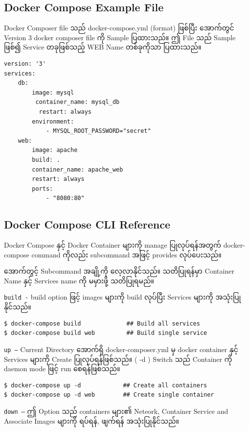 \documentclass{article}
\begin{document}
\subsection{Docker Compose Example
File}\label{docker-compose-example-file}

Docker Composer file သည် docker-compose.yml (format) ဖြစ်ပြီး အောက်တွင်
Version 3 docker composer file ကို Sample ပြထားသည်။ ဤ File သည် Sample
ဖြစ်၍ Service တခုဖြစ်သည့် WEB Name တစ်ခုကိုသာ ပြထားသည်။

\begin{verbatim}
version: '3'
services:
    db:
        image: mysql
         container_name: mysql_db
          restart: always
        environment:
            - MYSQL_ROOT_PASSWORD="secret"
    web:
        image: apache
        build: .
        container_name: apache_web
        restart: always
        ports:
            - "8080:80"
\end{verbatim}

\subsection{Docker Compose CLI
Reference}\label{docker-compose-cli-reference}

Docker Compose နှင့် Docker Container များကို manage ပြုလုပ်ရန်အတွက်
docker-compose command ကိုလည်း subcommand အဖြင့် provides လုပ်ပေးသည်။

အောက်တွင့် Subcommand အချို့ကို လေ့လာနိုင်သည်။ သတိပြုရန်မှာ Container
Name နှင့် Services name ကို မမှားဖို့ သတိပြုရမည်။

\texttt{build -} build option ဖြင့် images များကို build လုပ်ပြီး
Services များကို အသုံးပြုနိုင်သည်။

\begin{verbatim}
$ docker-compose build             ## Build all services
$ docker-compose build web         ## Build single service
\end{verbatim}

\texttt{up –} Current Directory အောက်ရှိ docker-composer.yml မှ docker
container နှင့် Services များကို Create ပြုလုပ်ရန်ဖြစ်သည်။ ( -d ) Switch
သည် Container ကို daemon mode ဖြင့် run စေရန်ဖြစ်သည်။

\begin{verbatim}
$ docker-compose up -d            ## Create all containers
$ docker-compose up -d web        ## Create single container
\end{verbatim}

\texttt{down –} ဤ Option သည် containers များ၏ Neteork, Container Service
and Associate Images များကို ရပ်ရန်, ဖျက်ရန် အသုံးပြုနိုင်သည်။
\end{document}

